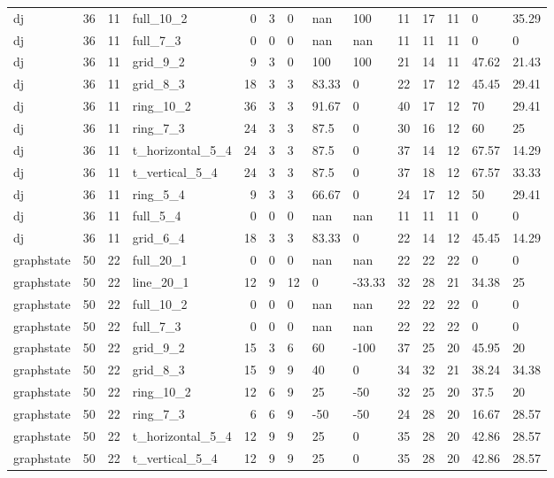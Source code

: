\begin{longtable}{lrrlrrlllrrlll}
dj & 36 & 11 & full\_10\_2 & 0 & 3 & 0 & nan & 100 & 11 & 17 & 11 & 0 & 35.29 \\
dj & 36 & 11 & full\_7\_3 & 0 & 0 & 0 & nan & nan & 11 & 11 & 11 & 0 & 0 \\
dj & 36 & 11 & grid\_9\_2 & 9 & 3 & 0 & 100 & 100 & 21 & 14 & 11 & 47.62 & 21.43 \\
dj & 36 & 11 & grid\_8\_3 & 18 & 3 & 3 & 83.33 & 0 & 22 & 17 & 12 & 45.45 & 29.41 \\
dj & 36 & 11 & ring\_10\_2 & 36 & 3 & 3 & 91.67 & 0 & 40 & 17 & 12 & 70 & 29.41 \\
dj & 36 & 11 & ring\_7\_3 & 24 & 3 & 3 & 87.5 & 0 & 30 & 16 & 12 & 60 & 25 \\
dj & 36 & 11 & t\_horizontal\_5\_4 & 24 & 3 & 3 & 87.5 & 0 & 37 & 14 & 12 & 67.57 & 14.29 \\
dj & 36 & 11 & t\_vertical\_5\_4 & 24 & 3 & 3 & 87.5 & 0 & 37 & 18 & 12 & 67.57 & 33.33 \\
dj & 36 & 11 & ring\_5\_4 & 9 & 3 & 3 & 66.67 & 0 & 24 & 17 & 12 & 50 & 29.41 \\
dj & 36 & 11 & full\_5\_4 & 0 & 0 & 0 & nan & nan & 11 & 11 & 11 & 0 & 0 \\
dj & 36 & 11 & grid\_6\_4 & 18 & 3 & 3 & 83.33 & 0 & 22 & 14 & 12 & 45.45 & 14.29 \\
graphstate & 50 & 22 & full\_20\_1 & 0 & 0 & 0 & nan & nan & 22 & 22 & 22 & 0 & 0 \\
graphstate & 50 & 22 & line\_20\_1 & 12 & 9 & 12 & 0 & -33.33 & 32 & 28 & 21 & 34.38 & 25 \\
graphstate & 50 & 22 & full\_10\_2 & 0 & 0 & 0 & nan & nan & 22 & 22 & 22 & 0 & 0 \\
graphstate & 50 & 22 & full\_7\_3 & 0 & 0 & 0 & nan & nan & 22 & 22 & 22 & 0 & 0 \\
graphstate & 50 & 22 & grid\_9\_2 & 15 & 3 & 6 & 60 & -100 & 37 & 25 & 20 & 45.95 & 20 \\
graphstate & 50 & 22 & grid\_8\_3 & 15 & 9 & 9 & 40 & 0 & 34 & 32 & 21 & 38.24 & 34.38 \\
graphstate & 50 & 22 & ring\_10\_2 & 12 & 6 & 9 & 25 & -50 & 32 & 25 & 20 & 37.5 & 20 \\
graphstate & 50 & 22 & ring\_7\_3 & 6 & 6 & 9 & -50 & -50 & 24 & 28 & 20 & 16.67 & 28.57 \\
graphstate & 50 & 22 & t\_horizontal\_5\_4 & 12 & 9 & 9 & 25 & 0 & 35 & 28 & 20 & 42.86 & 28.57 \\
graphstate & 50 & 22 & t\_vertical\_5\_4 & 12 & 9 & 9 & 25 & 0 & 35 & 28 & 20 & 42.86 & 28.57 \\

\end{longtable}
